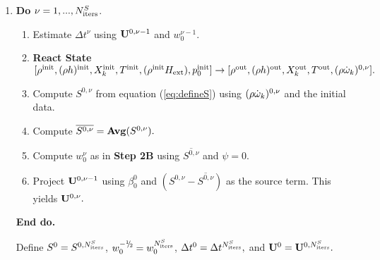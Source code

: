 \begin{enumerate}
\renewcommand{\theenumi}{{\bf \alph{enumi}}}
\renewcommand{\labelenumii}{\roman{enumii}.}

\item {\bf Do} {$\nu = 1,...,N_{\rm iters}^{S}$.}
  \begin{enumerate}

  \item Estimate $\Delta t^\nu$ using ${\bf U}^{0,\nu-1}$ and $w_0^{\nu-1}.$

  \item {\bf React State}$[ \rho^{\mathrm{init}},(\rho h)^{\mathrm{init}}, X_k^{\mathrm{init}}, T^{\mathrm{init}}, 
(\rho^{\mathrm{init}} {H_{\rm ext}}), p_0^{\mathrm{init}}] \rightarrow [\rho^{\mathrm{out}}, (\rho h)^{\mathrm{out}}, 
X_k^{\mathrm{out}}, T^{\mathrm{out}}, (\rho \dot{\omega}_k)^{0,\nu} ].$

  \item Compute $S^{0,\nu}$ from equation (\ref{eq:defineS}) 
        using $(\rho \dot{\omega}_k)^{0,\nu}$ and the initial data.

  \item Compute $\overline{S^{0,\nu}} = {\mathrm{\bf Avg}} (S^{0,\nu}).$

  \item Compute $w_0^{\nu}$ as in {\bf Step 2B} using $\overline{S^{0,\nu}}$ and $\psi=0$.
        
  \item Project ${\bf U}^{0,\nu-1}$ using $\beta_0^0$ and 
        $(S^{0,\nu} - \overline{S^{0,\nu}})$ as the source term.  
        This yields ${\bf U}^{0,\nu}.$

  \end{enumerate}

  {\bf End do.}

  Define $S^0 = S^{0,N_{\rm iters}^S}$, $w_0^{-\myhalf} = w_0^{N_{\rm iters}^S}$, 
$\Delta t^0 = \Delta t^{N_{\rm iters}^S},$ and ${\bf U}^0 = {\bf U}^{0,N_{\rm iters}^S}.$

\end{enumerate}

